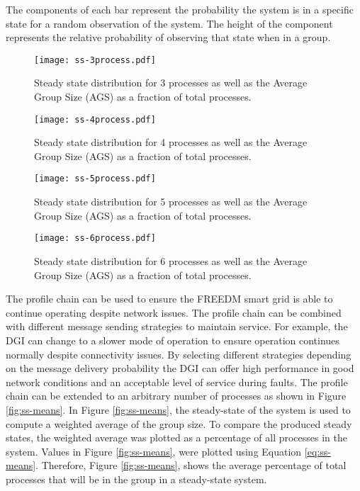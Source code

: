The components of each bar represent the probability the system is in a specific state for a random observation of the system.
The height of the component represents the relative probability of observing that state when in a group.

\begin{figure}
    \centering
    \texttt{[image: ss-3process.pdf]}
    \caption{Steady state distribution for 3 processes as well as the Average Group Size (AGS) as a fraction of total processes.}
    \label{fig:ss-3process}
\end{figure}

\begin{figure}
    \centering
    \texttt{[image: ss-4process.pdf]}
    \caption{Steady state distribution for 4 processes as well as the Average Group Size (AGS) as a fraction of total processes.}
    \label{fig:ss-4process}
\end{figure}

\begin{figure}
    \centering
    \texttt{[image: ss-5process.pdf]}
    \caption{Steady state distribution for 5 processes as well as the Average Group Size (AGS) as a fraction of total processes.}
    \label{fig:ss-5process}
\end{figure}

\begin{figure}
    \centering
    \texttt{[image: ss-6process.pdf]}
    \caption{Steady state distribution for 6 processes as well as the Average Group Size (AGS) as a fraction of total processes.}
    \label{fig:ss-6process}
\end{figure}

The profile chain can be used to ensure the FREEDM smart grid is able to continue operating despite network issues.
The profile chain can be combined with different message sending strategies to maintain service.
For example, the DGI can change to a slower mode of operation to ensure operation continues normally despite connectivity issues.
By selecting different strategies depending on the message delivery probability the DGI can offer high performance in good network conditions and an acceptable level of service during faults.
The profile chain can be extended to an arbitrary number of processes as shown in Figure \ref{fig:ss-means}.
In Figure \ref{fig:ss-means}, the steady-state of the system is used to compute a weighted average of the group size.
To compare the produced steady states, the weighted average was plotted as a percentage of all processes in the system.
Values in Figure \ref{fig:ss-means}, were plotted using Equation \ref{eq:ss-means}.
Therefore, Figure \ref{fig:ss-means}, shows the average percentage of total processes that will be in the group in a steady-state system.

